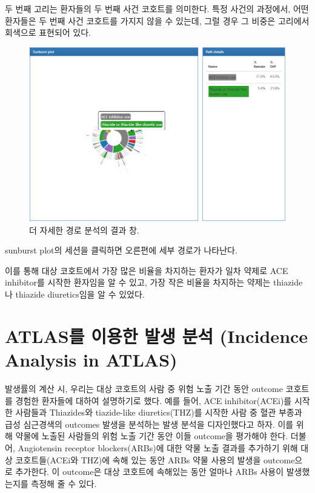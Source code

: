 \documentclass[11pt]{book}
\theoremstyle{definition}
\theoremstyle{definition}
\theoremstyle{definition}
\theoremstyle{remark}
\begin{document}
두 번째 고리는 환자들의 두 번째 사건 코호트를 의미한다. 특정 사건의
과정에서, 어떤 환자들은 두 번째 사건 코호트를 가지지 않을 수 있는데,
그럴 경우 그 비중은 고리에서 회색으로 표현되어 있다.

\begin{figure}

{\centering \includegraphics[width=1\linewidth]{images/Characterization/atlasPathwaysResultsPathDetails} 

}

\caption{더 자세한 경로 분석의 결과 창.}\label{fig:atlasPathwaysResultsPathDetails}
\end{figure}

sunburst plot의 세션을 클릭하면 오른편에 세부 경로가 나타난다.

이를 통해 대상 코호트에서 가장 많은 비율을 차지하는 환자가 일차 약제로
ACE inhibitor를 시작한 환자임을 알 수 있고, 가장 작은 비율을 차지하는
약제는 thiazide나 thiazide diuretics임을 알 수 있었다.

\section{ATLAS를 이용한 발생 분석 (Incidence Analysis in
ATLAS)}\label{atlas----incidence-analysis-in-atlas}

발생률의 계산 시, 우리는 대상 코호트의 사람 중 위험 노출 기간 동안
outcome 코호트를 경험한 환자들에 대하여 설명하기로 했다. 예를 들어, ACE
inhibitor(ACEi)를 시작한 사람들과 Thiazides와 tiazide-like
diuretics(THZ)를 시작한 사람 중 혈관 부종과 급성 심근경색의 outcomes
발생을 분석하는 발생 분석을 디자인했다고 하자. 이를 위해 약물에 노출된
사람들의 위험 노출 기간 동안 이들 outcome을 평가해야 한다. 더불어,
Angiotensin receptor blockers(ARBs)에 대한 약물 노출 결과를 추가하기
위해 대상 코호트들(ACEi와 THZ)에 속해 있는 동안 ARBs 약물 사용의 발생을
outcome으로 추가한다. 이 outcome은 대상 코호트에 속해있는 동안 얼마나
ARBs 사용이 발생했는지를 측정해 줄 수 있다.
\end{document}
